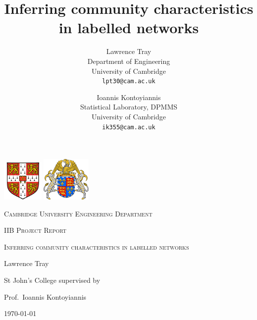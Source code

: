 \documentclass[12pt]{article}
\title{Inferring community characteristics in labelled networks}
\author{
  Lawrence Tray \\
  Department of Engineering \\
  University of Cambridge \\
  \texttt{lpt30@cam.ac.uk} \\
  \and
  Ioannis Kontoyiannis \\
  Statistical Laboratory, DPMMS \\
  University of Cambridge \\
  \texttt{ik355@cam.ac.uk}
}
\begin{document}
\begin{titlepage}
	\centering
	\includegraphics[width=0.15\textwidth]{cambridge} \hspace{1in}
	\includegraphics[width=0.18\textwidth]{sjc}\par\vspace{1cm}
	{\scshape\LARGE Cambridge University Engineering Department \par}
	\vspace{1cm}
	{\scshape\Large IIB Project Report \par}
	\vspace{1.5cm}
	{\scshape \huge Inferring community characteristics in labelled networks\par}
	\vspace{2cm}
	{\Large Lawrence Tray\par}
	{St John's College}
	\vfill
	supervised by\par
	Prof.~Ioannis Kontoyiannis
	
	\vfill
	
	{\large \today\par}
\end{titlepage}

%

\clearpage
\tableofcontents
\clearpage








%



\clearpage
\appendix
%

%
\clearpage

\end{document}
